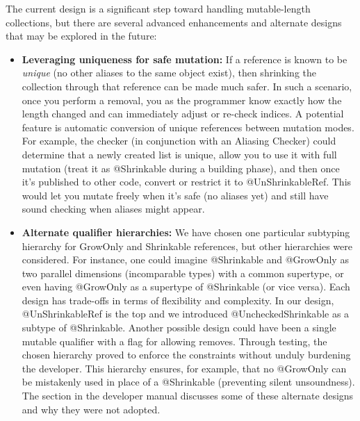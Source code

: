 The current design is a significant step toward handling mutable-length collections, but there
are several advanced enhancements and alternate designs that may be explored in the future:
\begin{itemize}
\item
  \textbf{Leveraging uniqueness for safe mutation:}
  If a reference is known to be \emph{unique} (no other aliases to the same object exist),
  then shrinking the collection through that reference can be made much safer. In such a scenario,
  once you perform a removal, you as the programmer know exactly how the length changed and can
  immediately adjust or re-check indices. A potential feature is automatic conversion of unique
  references between mutation modes. For example, the checker (in conjunction with an Aliasing Checker)
  could determine that a newly created list is unique, allow you to use it with full mutation
  (treat it as @Shrinkable during a building phase), and then once it’s published to other code,
  convert or restrict it to @UnShrinkableRef. This would let you mutate freely when it’s safe
  (no aliases yet) and still have sound checking when aliases might appear.

\item
  \textbf{Alternate qualifier hierarchies:}
    We have chosen one particular subtyping hierarchy for GrowOnly and Shrinkable references,
    but other hierarchies were considered. For instance, one could imagine @Shrinkable and
    @GrowOnly as two parallel dimensions (incomparable types) with a common supertype, or even
    having @GrowOnly as a supertype of @Shrinkable (or vice versa). Each design has trade-offs
    in terms of flexibility and complexity. In our design, @UnShrinkableRef is the top and we
    introduced @UncheckedShrinkable as a subtype of @Shrinkable. Another possible design could
    have been a single mutable qualifier with a flag for allowing removes. Through testing, the
    chosen hierarchy proved to enforce the constraints without unduly burdening the developer.
    This hierarchy ensures, for example, that no @GrowOnly can be mistakenly used in place of a
    @Shrinkable (preventing silent unsoundness). The section in the developer manual discusses some
    of these alternate designs and why they were not adopted.


\end{itemize}

